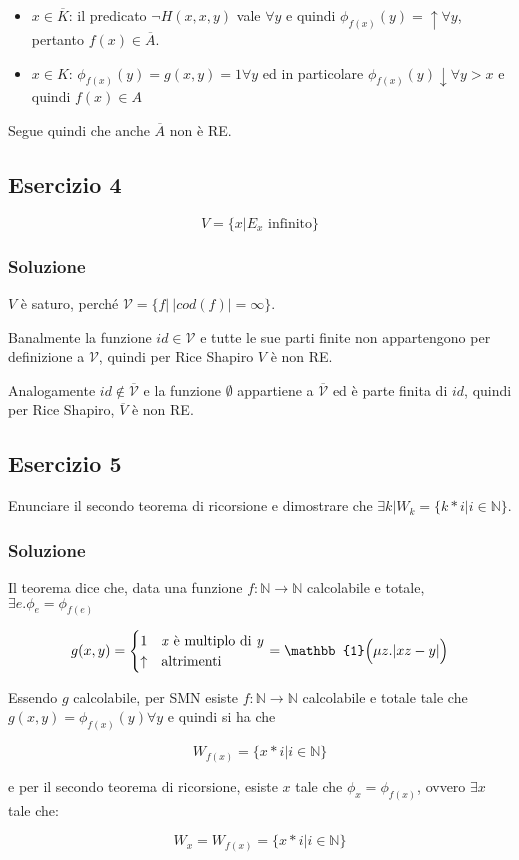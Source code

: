 \begin{itemize}
	\item $x \in \overline{K}$: il predicato $\neg H(x,x,y)$ vale $\forall y$ e quindi $\phi_{f(x)}(y) = \uparrow \forall y$, pertanto $f(x) \in \overline{A}$.
	\item $x \in K$: $\phi_{f(x)}(y) = g(x,y) = 1 \forall y$ ed in particolare $\phi_{f(x)}(y)\downarrow \forall y > x$ e quindi $f(x) \in A$
\end{itemize}

Segue quindi che anche $\overline{A}$ non è RE.

\subsection{Esercizio 4}

$$V = \{x | E_x \text{ infinito}\}$$

\subsubsection{Soluzione}

$V$ è saturo, perché $\mathcal{V} = \{f | \:  |cod(f)| = \infty \}$.

Banalmente la funzione $id \in \mathcal{V}$ e tutte le sue parti finite non appartengono per definizione a $\mathcal{V}$, quindi per Rice Shapiro $V$ è non RE.

Analogamente $id \notin \overline{\mathcal{V}}$ e la funzione $\emptyset$ appartiene a $ \overline{\mathcal{V}}$ ed è parte finita di $id$, quindi per Rice Shapiro, $ \overline{V}$ è non RE.


\subsection{Esercizio 5}

Enunciare il secondo teorema di ricorsione e dimostrare che $\exists k | W_k = \{k * i | i \in \mathbb{N}\}$.

\subsubsection{Soluzione}

Il teorema dice che, data una funzione $f : \mathbb{N} \rightarrow \mathbb{N}$ calcolabile e totale, $\exists e . \phi_e = \phi_{f(e)}$

$$
g(x, y) = \begin{cases}
1 &\text{\textit{x} è multiplo di \textit{y}} \\
\uparrow &\text{altrimenti}
\end{cases} = \mathbb{1}\Big( \mu z . |xz - y| \Big)
$$

Essendo $g$ calcolabile, per SMN esiste $f : \mathbb{N} \rightarrow \mathbb{N}$ calcolabile e totale tale che $g(x,y) = \phi_{f(x)}(y) \forall y$ e quindi si ha che

$$
W_{f(x)} = \{x * i | i \in \mathbb{N}\}
$$

e per il secondo teorema di ricorsione, esiste $x$ tale che $\phi_x = \phi_{f(x)}$, ovvero $\exists x$ tale che:

$$
W_x = W_{f(x)} = \{x * i | i \in \mathbb{N}\}
$$
